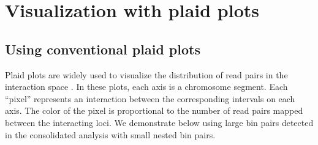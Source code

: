 \documentclass{report}\usepackage[]{graphicx}\usepackage[usenames,dvipsnames]{color}
\begin{document}
\section{Visualization with plaid plots}
\label{chap:plaid}

\subsection{Using conventional plaid plots}
Plaid plots are widely used to visualize the distribution of read pairs in the interaction space \cite{lieberman2009comprehensive}. 
In these plots, each axis is a chromosome segment. 
Each ``pixel'' represents an interaction between the corresponding intervals on each axis. 
The color of the pixel is proportional to the number of read pairs mapped between the interacting loci.
We demonstrate below using large bin pairs detected in the consolidated analysis with small nested bin pairs.
\end{document}
